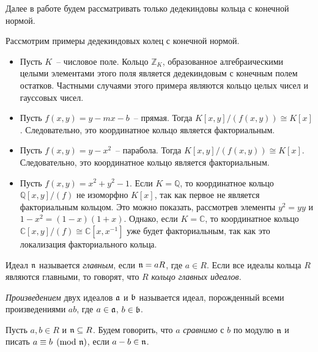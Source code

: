 \documentclass[_00_autoref.tex]{subfiles}
\begin{document}
Далее в работе будем рассматривать только дедекиндовы кольца с конечной нормой.

\begin{example}
    Рассмотрим примеры дедекиндовых колец с конечной нормой.
    \begin{itemize}
        \item Пусть $K$~-- числовое поле.
        Кольцо $\mathbb{Z}_K$, образованное алгебраическими целыми элементами этого поля является дедекиндовым с конечным полем остатков.
        Частными случаями этого примера являются кольцо целых чисел и гауссовых чисел.
        
        \item Пусть $f(x, y) = y - mx - b$~-- прямая.
        Тогда $K[x, y]/(f(x, y)) \cong K[x]$.
        Следовательно, это координатное кольцо является факториальным.
        
        \item Пусть $f(x, y) = y - x^2$~-- парабола.
        Тогда $K[x, y]/(f(x, y)) \cong K[x]$.
        Следовательно, это координатное кольцо является факториальным.
    
        \item Пусть $f(x, y) = x^2 + y^2 - 1$.
        Если $K = \mathbb{Q}$, то координатное кольцо $\mathbb{Q}[x, y]/(f)$ не изоморфно $K[x]$, так как первое не является факториальным кольцом.
        Это можно показать, рассмотрев элементы $y^2 = yy$ и $1-x^2 = (1-x)(1+x)$.
        Однако, если $K = \mathbb{C}$, то координатное кольцо $\mathbb{C}[x, y]/(f) \cong \mathbb{C}[x, x^{-1}]$ уже будет факториальным, так как это локализация факториального кольца.
    \end{itemize}
\end{example}

\begin{definition}
    Идеал $\mathfrak{n}$ называется \emph{главным}, если $\mathfrak{n} = aR$, где $a \in R$.
    Если все идеалы кольца $R$ являются главными, то говорят, что $R$ \emph{кольцо главных идеалов}.
\end{definition}

\begin{definition}
    \emph{Произведением} двух идеалов $\mathfrak{a}$ и $\mathfrak{b}$ называется идеал, порожденный всеми произведениями $ab$, где $a \in \mathfrak{a}$, $b \in \mathfrak{b}$.
\end{definition}

\begin{definition}
    Пусть $a, b \in R$ и $\mathfrak{n} \subseteq R$.
    Будем говорить, что $a$ \emph{сравнимо} с $b$ по модулю $\mathfrak{n}$ и писать $a \equiv b \pmod{\mathfrak{n}}$, если $a - b \in \mathfrak{n}$.
\end{definition}
\end{document}
